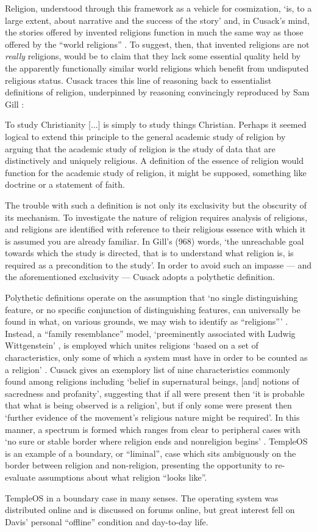 Religion, understood through this framework as a vehicle for cosmization,
`is, to a large extent, about narrative and the success of the story'
and, in Cusack's mind,
the stories offered by invented religions function in much the same way
as those offered by the ``world religions'' \parencite[4]{Cusack10}.
To suggest, then, that invented religions are not \textit{really} religions,
would be to claim that they lack some essential quality held by
the apparently functionally similar world religions
which benefit from undisputed religious status.
Cusack traces this line of reasoning back to essentialist definitions
of religion, underpinned by reasoning convincingly
reproduced by Sam Gill \parencite*[968]{Gill94}:
\begin{displayquote}
  To study Christianity [...] is simply to study things Christian.
  Perhaps it seemed logical to extend this principle to the general
  academic study of religion by arguing that the academic study of religion
  is the study of data that are distinctively and uniquely religious.
  A definition of the essence of religion would function for the academic
  study of religion, it might be supposed, something like doctrine or a
  statement of faith.
\end{displayquote}
The trouble with such a definition is not only its exclusivity but the
obscurity of its mechanism.
To investigate the nature of religion requires analysis of religions,
and religions are identified with reference to their religious essence
with which it is assumed you are already familiar.
In Gill's (968) words, `the unreachable goal towards which the study
is directed, that is to understand what religion is,
is required as a precondition to the study'.
In order to avoid such an impasse --- and the aforementioned exclusivity ---
Cusack adopts a polythetic definition.

Polythetic definitions operate on the assumption that
`no single distinguishing feature, or no specific conjunction
of distinguishing features, can universally be found in what,
on various grounds, we may wish to identify as ``religions''\thinspace'
\parencite[158]{Saler93}.
Instead, a ``family resemblance'' model, `preeminently associated with
Ludwig Wittgenstein' \parencite[159]{Saler93}, is employed which unites
religions `based on a set of characteristics, only some of which a system
must have in order to be counted as a religion' \parencite[158]{Wilson98}.
Cusack \parencite*[20]{Cusack10} gives an exemplory list
of nine characteristics commonly found among religions including
`belief in supernatural beings, [and] notions of sacredness and profanity',
suggesting that if all were present then `it is probable that what is being
observed is a religion', but if only some were present then `further
evidence of the movement's religious nature might be required'.
In this manner, a spectrum is formed which ranges from clear to
peripheral cases with `no sure or stable border where religion ends and
nonreligion begins' \parencite[396]{Saler99}.
TempleOS is an example of a boundary, or ``liminal'', case which sits
ambiguously on the border between religion and non-religion, presenting
the opportunity to re-evaluate assumptions about what religion ``looks like''.

TempleOS in a boundary case in many senses.
The operating system was distributed online and is discussed on forums
online, but great interest fell on Davis' personal ``offline'' condition
and day-to-day life.



\clearpage
\printbibliography


